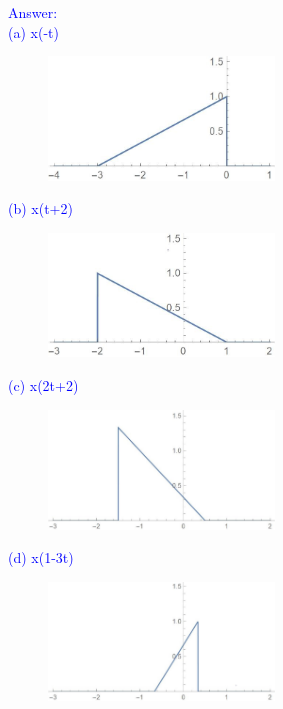 \documentclass[12pt,a4paper]{article}
\begin{document}
\begin{tcolorbox}
\normalsize
\textcolor{blue}{Answer:\\
(a) x(-t)
\begin{figure}[H]
    \centering
    \includegraphics[width=6cm]{8a.jpg}
\end{figure}
(b) x(t+2)
\begin{figure}[H]
    \centering
    \includegraphics[width=6cm]{8b.jpg}
\end{figure}
(c) x(2t+2)
\begin{figure}[H]
    \centering
    \includegraphics[width=6cm]{8c.jpg}
\end{figure}
(d) x(1-3t)
\begin{figure}[H]
    \centering
    \includegraphics[width=6cm]{8d.jpg}
\end{figure}
}


\end{tcolorbox}

\end{document}
